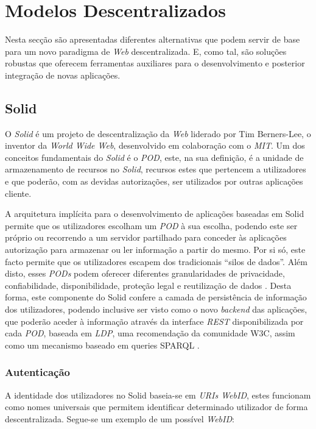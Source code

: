 \section{Modelos Descentralizados \label{section_modelos_descentralizados}}
Nesta secção são apresentadas diferentes alternativas que podem servir de base para um novo paradigma de \emph{Web} descentralizada. E, como tal, são soluções robustas que oferecem ferramentas auxiliares para o desenvolvimento e posterior integração de novas aplicações.

\subsection{Solid \label{estado_arte_solid}}
O \emph{Solid} é um projeto de descentralização da \emph{Web} liderado por Tim Berners-Lee, o inventor da \emph{World Wide Web}, desenvolvido em colaboração com o \emph{\acrfull{MIT}}.
Um dos conceitos fundamentais do \emph{Solid} é o \emph{\acrfull{POD}}, este, na sua definição, é a unidade de armazenamento de recursos no \emph{Solid}, recursos estes que pertencem a utilizadores e que poderão, com as devidas autorizações, ser utilizados por outras aplicações cliente.

A arquitetura implícita para o desenvolvimento de aplicações baseadas em Solid permite que os utilizadores escolham um \emph{\acrshort{POD}} à sua escolha, podendo este ser próprio ou recorrendo a um servidor partilhado para conceder às aplicações autorização para armazenar ou ler informação a partir do mesmo. Por si só, este facto permite que os utilizadores escapem dos tradicionais “silos de dados”. Além disto, esses \emph{PODs} podem oferecer diferentes granularidades de privacidade, confiabilidade, disponibilidade, proteção legal e reutilização de dados \cite{solid_official}. Desta forma, este componente do Solid confere a camada de persistência de informação dos utilizadores, podendo inclusive ser visto como o novo \emph{backend} das aplicações, que poderão aceder à informação através da interface \emph{\acrfull{REST}} \cite{rest_foundations} disponibilizada por cada \emph{\acrshort{POD}}, baseada em \emph{\acrfull{LDP}}, uma recomendação da comunidade W3C, assim como um mecanismo baseado em queries SPARQL \cite{solid_spec}.


\subsubsection{Autenticação \label{section_estado_arte_solid_authentication}}
A identidade dos utilizadores no Solid baseia-se em \emph{URIs WebID}, estes funcionam como nomes universais que permitem identificar determinado utilizador de forma descentralizada. Segue-se um exemplo de um possível \emph{WebID}:

